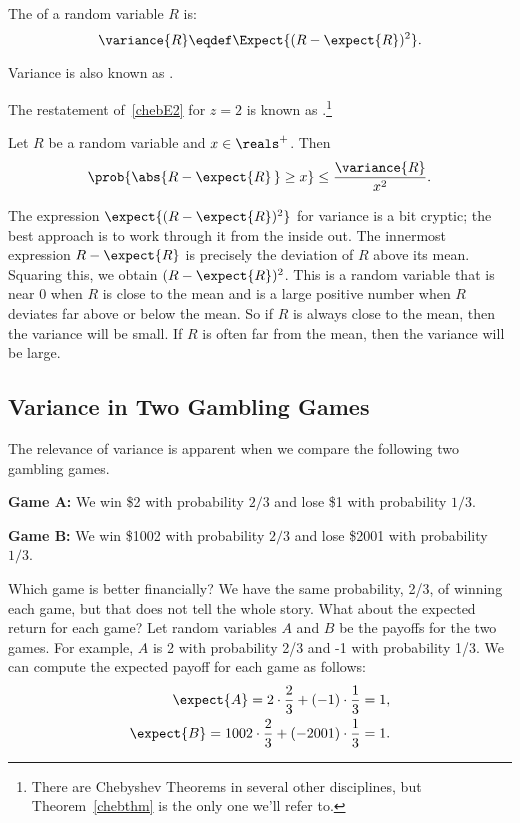 \begin{definition}\label{defvar}
The  of a random variable $R$ is:
\[
\variance{R} \eqdef \Expect{(R - \expect{R})^2}.
\]
\end{definition}
Variance is also known as .

The restatement of~\eqref{chebE2} for $z=2$ is known as
.\footnote{There are Chebyshev Theorems in
  several other disciplines, but Theorem~\ref{chebthm} is the only one
  we'll refer to.}
\begin{theorem}[Chebyshev]\label{chebthm}
  Let $R$ be a random variable and $x \in \reals^+$.  Then
\[
\prob{\abs{R - \expect{R}\, } \geq x} \leq \frac{\variance{R}}{x^2}.
\]
\end{theorem}

The expression $\expect{(R - \expect{R})^2}$ for variance is a bit
cryptic; the best approach is to work through it from the inside out.  The
innermost expression $R - \expect{R}$ is precisely the deviation of $R$
above its mean.  Squaring this, we obtain $(R - \expect{R})^2$.  This is
a random variable that is near 0 when $R$ is close to the mean and is a
large positive number when $R$ deviates far above or below the mean.  So
if $R$ is always close to the mean, then the variance will be small.  If
$R$ is often far from the mean, then the variance will be large.

\subsection{Variance in Two Gambling Games}

The relevance of variance is apparent when we compare the following
two gambling games.

\textbf{Game A:} We win \$2 with probability $2/3$ and lose \$1 with probability
$1/3$.

\textbf{Game B:} We win \$1002 with probability $2/3$ and lose \$2001 with
probability $1/3$.

Which game is better financially?  We have the same probability, 2/3,
of winning each game, but that does not tell the whole story.  What about
the expected return for each game?  Let random variables $A$ and $B$ be
the payoffs for the two games.  For example, $A$ is 2 with probability
2/3 and -1 with probability 1/3.  We can compute the
expected payoff for each game as follows:
\begin{eqnarray*}
\expect{A} = 2 \cdot \frac{2}{3} + (-1) \cdot \frac{1}{3} = 1, \\
\expect{B} = 1002 \cdot \frac{2}{3} + (-2001) \cdot \frac{1}{3} = 1.
\end{eqnarray*}

